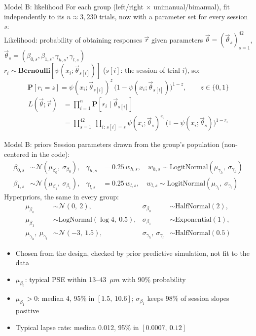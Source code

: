 \begin{frame}{Model B: likelihood}
  For each group (left/right $\times$ unimanual/bimanual), fit independently to its
  $n \approx 3{,}230$ trials, now with a parameter set for every session $s$:\\[0.3em]
  Likelihood: probability of obtaining responses $\vec{r}$ given parameters
  $\vec{\theta} = (\vec{\theta}_s)_{s=1}^{42}$,
  $\vec{\theta}_s = (\beta_{0,s}, \beta_{1,s}, \gamma_{h,s}, \gamma_{l,s})$\\
  $r_i \sim \mathbf{Bernoulli}[\psi(x_i;\vec{\theta}_{s[i]})]$ ($s[i]$: the session of trial $i$), so:
  \[
    \mathbf{P}[r_i = z] = \psi(x_i;\vec{\theta}_{s[i]})^{z}\,
                          \big(1-\psi(x_i;\vec{\theta}_{s[i]})\big)^{1-z},
    \qquad z \in \{0, 1\}
  \]
  \begin{align*}
    L(\vec{\theta};\vec{r}) &= \prod_{i=1}^{n} \mathbf{P}[r_i \mid \vec{\theta}_{s[i]}]\\
    &= \prod_{s=1}^{42}\ \prod_{i:\, s[i]=s} \psi(x_i;\vec{\theta}_s)^{r_i}\,
       \big(1-\psi(x_i;\vec{\theta}_s)\big)^{1-r_i}
  \end{align*}
\end{frame}

\begin{frame}{Model B: priors}
  Session parameters drawn from the group's population (non-centered in the code):
  \begin{align*}
    \beta_{0,s} &\sim \mathcal{N}(\mu_{\beta_0},\ \sigma_{\beta_0}), &
    \gamma_{h,s} &= 0.25\, w_{h,s}, \quad w_{h,s} \sim \text{LogitNormal}(\mu_{\gamma_h},\ \sigma_{\gamma_h}) \\
    \beta_{1,s} &\sim \mathcal{N}(\mu_{\beta_1},\ \sigma_{\beta_1}), &
    \gamma_{l,s} &= 0.25\, w_{l,s}, \quad w_{l,s} \sim \text{LogitNormal}(\mu_{\gamma_l},\ \sigma_{\gamma_l})
  \end{align*}
  Hyperpriors, the same in every group:
  \begin{align*}
    \mu_{\beta_0} &\sim \mathcal{N}(0,\ 2), & \sigma_{\beta_0} &\sim \text{HalfNormal}(2), \\
    \mu_{\beta_1} &\sim \text{LogNormal}(\log 4,\ 0.5), & \sigma_{\beta_1} &\sim \text{Exponential}(1), \\
    \mu_{\gamma_h},\ \mu_{\gamma_l} &\sim \mathcal{N}(-3,\ 1.5), &
    \sigma_{\gamma_h},\ \sigma_{\gamma_l} &\sim \text{HalfNormal}(0.5)
  \end{align*}
  \vspace{-0.6em}
  {\small
  \begin{itemize}
    \item Chosen from the design, checked by prior predictive simulation, not fit to the data
    \item $\mu_{\beta_0}$: typical PSE within 13--43~$\mu m$ with 90\% probability
    \item $\mu_{\beta_1} > 0$: median 4, 95\% in $[1.5,\ 10.6]$; $\sigma_{\beta_1}$ keeps 98\% of
          session slopes positive
    \item Typical lapse rate: median 0.012, 95\% in $[0.0007,\ 0.12]$
  \end{itemize}}
\end{frame}

